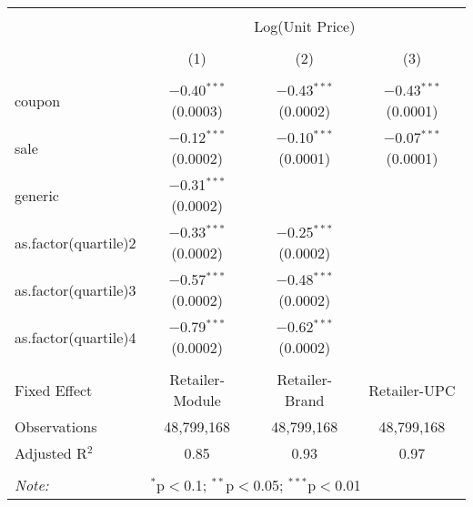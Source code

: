 
\begin{table}[!htbp] \centering 
  \caption{} 
  \label{tab:overallSavings} 
\begin{tabular}{@{\extracolsep{5pt}}lccc} 
\\[-1.8ex]\hline 
\hline \\[-1.8ex] 
 & \multicolumn{3}{c}{Log(Unit Price)} \\ 
\\[-1.8ex] & (1) & (2) & (3)\\ 
\hline \\[-1.8ex] 
 coupon & $-$0.40$^{***}$ (0.0003) & $-$0.43$^{***}$ (0.0002) & $-$0.43$^{***}$ (0.0001) \\ 
  sale & $-$0.12$^{***}$ (0.0002) & $-$0.10$^{***}$ (0.0001) & $-$0.07$^{***}$ (0.0001) \\ 
  generic & $-$0.31$^{***}$ (0.0002) &  &  \\ 
  as.factor(quartile)2 & $-$0.33$^{***}$ (0.0002) & $-$0.25$^{***}$ (0.0002) &  \\ 
  as.factor(quartile)3 & $-$0.57$^{***}$ (0.0002) & $-$0.48$^{***}$ (0.0002) &  \\ 
  as.factor(quartile)4 & $-$0.79$^{***}$ (0.0002) & $-$0.62$^{***}$ (0.0002) &  \\ 
 \hline \\[-1.8ex] 
Fixed Effect & Retailer-Module & Retailer-Brand & Retailer-UPC \\ 
Observations & 48,799,168 & 48,799,168 & 48,799,168 \\ 
Adjusted R$^{2}$ & 0.85 & 0.93 & 0.97 \\ 
\hline 
\hline \\[-1.8ex] 
\textit{Note:}  & \multicolumn{3}{l}{$^{*}$p$<$0.1; $^{**}$p$<$0.05; $^{***}$p$<$0.01} \\ 
\end{tabular} 
\end{table} 
